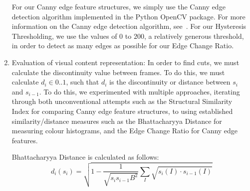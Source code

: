 \documentclass[12pt]{article}
\begin{document}
\begin{enumerate}
    For our Canny edge feature structures, we simply use the Canny edge detection algorithm implemented in the Python OpenCV package. For more information on the Canny edge 
    detection algorithm, see~\cite{canny}. For our Hysteresis Thresholding, we use the values of $0$ to $200$, a relatively generous threshold, in order to detect as many edges 
    as possible for our Edge Change Ratio. 
    \item Evaluation of visual content representation: In order to find cuts, we must calculate the discontinuity value between frames. To do this, we must calculate 
    $d_i \in 0 .. 1$, such that $d_i$ is the discontinuity or distance between $s_i$ and $s_{i-1}$. To do this, we experimented with multiple approaches, iterating through 
    both unconventional attempts such as the Structural Similarity Index for comparing Canny edge feature structures, to using established similarity/distance measures such 
    as the Bhattacharyya Distance for measuring colour histograms, and the Edge Change Ratio for Canny edge features.

    Bhattacharyya Distance is calculated as follows: 
    $$d_i(s_i) = \sqrt{1 - \frac{1}{\sqrt{s_is_{i-1}B^2}}\sum_{I}\sqrt{s_i(I) \cdot s_{i-1}(I)}}$$
    

\end{enumerate}
\end{document}
